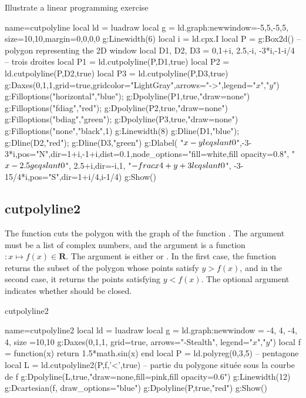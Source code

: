 \begin{demo}{Illustrate a linear programming exercise}
\begin{luadraw}{name=cutpolyline}
local ld = luadraw
local g = ld.graph:new{window={-5,5,-5,5}, size={10,10},margin={0,0,0,0}}
g:Linewidth(6)
local i = ld.cpx.I
local P = g:Box2d() -- polygon representing the 2D window
local D1, D2, D3 = {0,1+i}, {2.5,-i}, {-3*i,-1-i/4} -- trois droites
local P1 = ld.cutpolyline(P,D1,true)
local P2 = ld.cutpolyline(P,D2,true)
local P3 = ld.cutpolyline(P,D3,true)
g:Daxes({0,1,1},{grid=true,gridcolor="LightGray",arrows="->",legend={"$x$","$y$"}})
g:Filloptions("horizontal","blue"); g:Dpolyline(P1,true,"draw=none")
g:Filloptions("fdiag","red"); g:Dpolyline(P2,true,"draw=none")
g:Filloptions("bdiag","green"); g:Dpolyline(P3,true,"draw=none")
g:Filloptions("none","black",1)
g:Linewidth(8)
g:Dline(D1,"blue"); g:Dline(D2,"red"); g:Dline(D3,"green")
g:Dlabel(
  "$x-y\\leqslant 0$",-3-3*i,{pos="N",dir={1+i,-1+i},dist=0.1,node_options="fill=white,fill opacity=0.8"},
  "$x-2.5\\geqslant0$", 2.5+i,{dir={-i,1}},
  "$-\\frac{x}{4}+y+3\\leqslant0$", -3-15/4*i,{pos="S",dir={1+i/4,i-1/4}})
g:Show()
\end{luadraw}
\end{demo}

\subsection{cutpolyline2}

The function  cuts the polygon  with the graph of the function . The argument  must be a list of complex numbers, and the argument  is a function $\colon x \mapsto f(x)\in \mathbf R$. The argument  is either  or . In the first case, the function returns the subset of the polygon  whose points satisfy $y>f(x)$, and in the second case, it returns the points satisfying $y<f(x)$. The optional argument  indicates whether  should be closed.

\begin{demo}{cutpolyline2}
\begin{luadraw}{name=cutpolyline2}
local ld = luadraw
local g = ld.graph:new{window = {-4, 4, -4, 4}, size ={10,10}}
g:Daxes({0,1,1}, {grid=true, arrows="-Stealth", legend={"$x$","$y$"}})
local f = function(x) return 1.5*math.sin(x) end
local P = ld.polyreg(0,3,5) -- pentagone
local L = ld.cutpolyline2(P,f,'<',true) -- partie du polygone située sous la courbe de f
g:Dpolyline(L,true,"draw=none,fill=pink,fill opacity=0.6")
g:Linewidth(12)
g:Dcartesian(f, {draw_options="blue"})
g:Dpolyline(P,true,"red")
g:Show()
\end{luadraw}
\end{demo}

